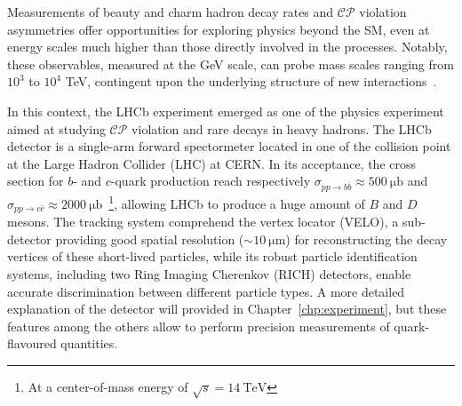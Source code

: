 Measurements of beauty and charm hadron decay rates and $\mathcal{CP}$ violation asymmetries offer opportunities for exploring physics beyond the SM, even at energy scales much higher than those directly involved in the processes. Notably, these observables, measured at the GeV scale, can probe mass scales ranging from $10^3$ to $10^4$ TeV, contingent upon the underlying structure of new interactions~\cite{Isidori_2010}. 

In this context, the LHCb experiment emerged as one of the physics experiment aimed at studying $\mathcal{CP}$ violation and rare decays in heavy hadrons. The LHCb detector is a single-arm forward spectormeter located in one of the collision point at the Large Hadron Collider (LHC) at CERN. In its acceptance, the cross section for $b$- and $c$-quark production reach respectively $\sigma_{pp\rightarrow b\bar{b}}\approx\SI{500}{\micro\barn}$ and $\sigma_{pp\rightarrow c\bar{c}}\approx\SI{2000}{\micro\barn}$~\cite{bCrossSection, Aaij:2057627}\footnote{At a center-of-mass energy of $\sqrt{s}=\SI{14}{\tera\eV}$}, allowing LHCb to produce a huge amount of $B$ and $D$ mesons. The tracking system comprehend the vertex locator (VELO), a sub-detector providing good spatial resolution ($\sim \SI{10}{\micro\meter}$) for reconstructing the decay vertices of these short-lived particles, while its robust particle identification systems, including two Ring Imaging Cherenkov (RICH) detectors, enable accurate discrimination between different particle types. A more detailed explanation of the detector will provided in Chapter~\ref{chp:experiment}, but these features among the others allow to perform precision measurements of quark-flavoured quantities.


